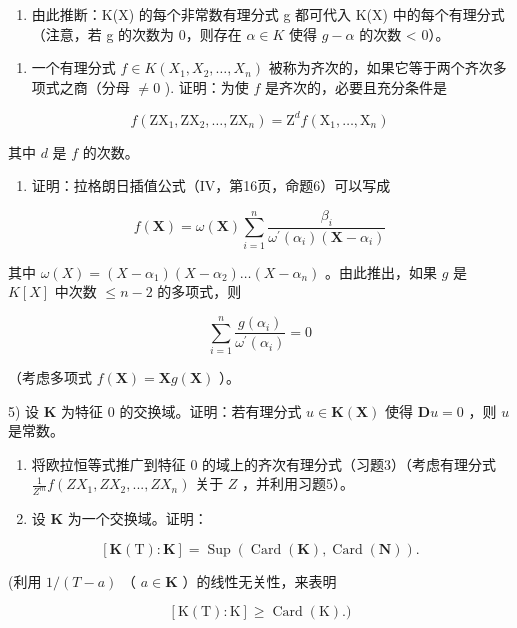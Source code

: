 \begin{enumerate}
\def\labelenumi{\alph{enumi})}
\setcounter{enumi}{1}
\tightlist
\item
  由此推断：K(X) 的每个非常数有理分式 g 都可代入 K(X) 中的每个有理分式（注意，若 g 的次数为 0，则存在 \(\alpha \in K\) 使得 \(g - \alpha\) 的次数 \textless{} 0）。
\end{enumerate}

\begin{enumerate}
\def\labelenumi{\arabic{enumi})}
\setcounter{enumi}{2}
\tightlist
\item
  一个有理分式 \(f \in K(X_1, X_2, \ldots, X_n)\) 被称为齐次的，如果它等于两个齐次多项式之商（分母 \(\neq 0\) ). 证明：为使 \(f\) 是齐次的，必要且充分条件是
\end{enumerate}

\[
f \left(\mathrm{ZX} _ {1}, \mathrm{ZX} _ {2}, \dots , \mathrm{ZX} _ {n}\right) = \mathrm{Z} ^ {d} f \left(\mathrm{X} _ {1}, \dots , \mathrm{X} _ {n}\right)
\]

其中 \(d\) 是 \(f\) 的次数。

\begin{enumerate}
\def\labelenumi{\arabic{enumi})}
\setcounter{enumi}{3}
\tightlist
\item
  证明：拉格朗日插值公式（IV，第16页，命题6）可以写成
\end{enumerate}

\[
f (\mathbf {X}) = \omega (\mathbf {X}) \sum_ {i = 1} ^ {n} \frac {\beta_ {i}}{\omega^ {\prime} (\alpha_ {i}) (\mathbf {X} - \alpha_ {i})}
\]

其中 \(\omega(X) = (X - \alpha_1)(X - \alpha_2) \ldots (X - \alpha_n)\) 。由此推出，如果 \(g\) 是 \(K[X]\) 中次数 \(\leqslant n - 2\) 的多项式，则

\[
\sum_ {i = 1} ^ {n} \frac {g (\alpha_ {i})}{\omega^ {\prime} (\alpha_ {i})} = 0
\]

（考虑多项式 \(f(\mathbf{X}) = \mathbf{X}g(\mathbf{X})\) ）。

5) 设 \(\mathbf{K}\) 为特征 0 的交换域。证明：若有理分式 \(u \in \mathbf{K}(\mathbf{X})\) 使得 \(\mathbf{D}u = 0\) ，则 \(u\) 是常数。

\begin{enumerate}
\def\labelenumi{\arabic{enumi})}
\setcounter{enumi}{5}
\item
  将欧拉恒等式推广到特征 0 的域上的齐次有理分式（习题3）（考虑有理分式 \(\frac{1}{Z^m} f(ZX_1, ZX_2, ..., ZX_n)\) 关于 \(Z\) ，并利用习题5）。
\item
  设 \(\mathbf{K}\) 为一个交换域。证明：
\end{enumerate}

\[
[ \mathbf {K} (\mathrm{T}): \mathbf {K} ] = \operatorname{Sup} (\operatorname{Card} (\mathbf {K}), \operatorname{Card} (\mathbf {N})).
\]

(利用 \(1 / (T - a)\) （ \(a \in \mathbf{K}\) ）的线性无关性，来表明

\[
[ \mathrm{K} (\mathrm{T}): \mathrm{K} ] \geqslant \operatorname{Card} (\mathrm{K}).)
\]
